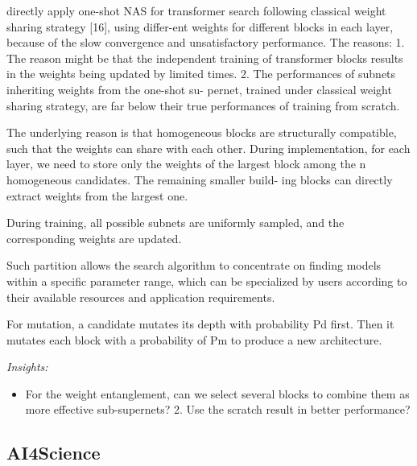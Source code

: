 \documentclass[UTF8]{article}
\begin{document}
    directly apply one-shot NAS for transformer search following classical weight sharing strategy [16], using differ-ent weights for different blocks in each layer, because of the slow convergence and unsatisfactory performance. The reasons: 1. The reason might be that the independent training of transformer blocks results in the weights being updated by limited times. 2. The performances of subnets inheriting weights from the one-shot su- pernet, trained under classical weight sharing strategy, are far below their true performances of training from scratch. 
    
    The underlying reason is that homogeneous blocks are structurally compatible, such that the weights can share with each other. During implementation, for each layer, we need to store only the weights of the largest block among the n homogeneous candidates. The remaining smaller build- ing blocks can directly extract weights from the largest one.
    
    During training, all possible subnets are uniformly sampled, and the corresponding weights are updated.
    
    Such partition allows the search algorithm to concentrate on finding models within a specific parameter range, which can be specialized by users according to their available resources and application requirements.
    
    For mutation, a candidate mutates its depth with probability Pd first. Then it mutates each block with a probability of Pm to produce a new architecture.
    
    \emph{Insights:} 
    \begin{itemize}
        \item For the weight entanglement, can we select several blocks to combine them as more effective sub-supernets?  2. Use the scratch result in better performance?
    \end{itemize}
    
\subsection{AI4Science}
\end{document}
